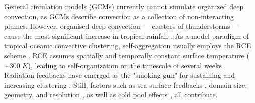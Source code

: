 \documentclass[draft,linenumbers]{agujournal2019}
\begin{document}

\noindent
General circulation models (GCMs) currently cannot simulate organized deep convection, as GCMs describe convection as a collection of non-interacting plumes. 
However, organised deep convection --- clusters of thunderstorms --- 
cause the most significant increase in tropical rainfall \cite{tan2015increases}. 
As a model paradigm of tropical oceanic convective clustering, self-aggregation
usually employs the RCE scheme \cite{held1993radiative,tompkins1998radiative}. 
RCE assumes spatially and temporally constant surface temperature ($\sim 300\;K$), leading to self-organization on the timescale of several weeks \cite{bretherton2005energy,khairoutdinov2010aggregation,muller2012detailed,wing2017convective}. 
Radiation feedbacks have emerged as the "smoking gun" for sustaining and increasing clustering \cite{bretherton2005energy}. 
Still, factors such as sea surface feedbacks \cite{hohenegger2016coupled}, domain size, geometry, and resolution \cite{muller2015favors}, as well as cold pool effects \cite{jeevanjee2013convective,haerter2019convective}, all contribute.
\end{document}
